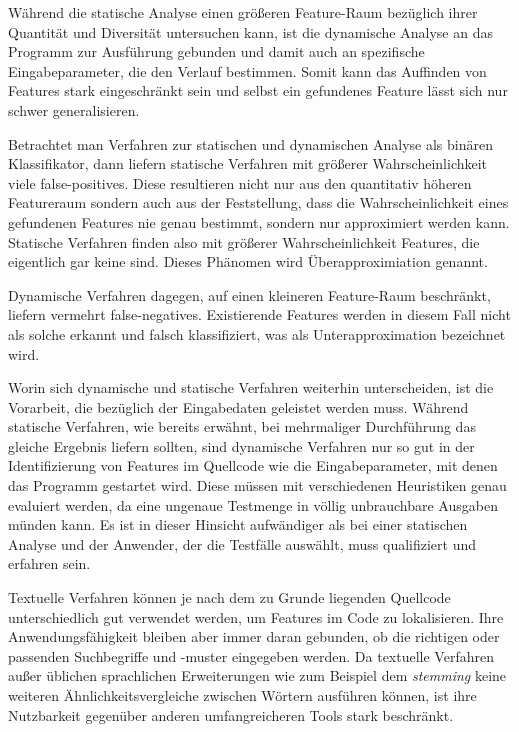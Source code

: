 \documentclass[runningheads,a4paper]{llncs}
\begin{document}
Während die statische Analyse einen größeren Feature-Raum bezüglich ihrer Quantität und Diversität untersuchen kann, ist die dynamische Analyse an das Programm zur Ausführung gebunden und damit auch an spezifische Eingabeparameter, die den Verlauf bestimmen. Somit kann das Auffinden von Features stark eingeschränkt sein und selbst ein gefundenes Feature lässt sich nur schwer generalisieren.

Betrachtet man Verfahren zur statischen und dynamischen Analyse als binären Klassifikator, dann liefern statische Verfahren mit größerer Wahrscheinlichkeit viele false-positives. Diese resultieren nicht nur aus den quantitativ höheren Featureraum sondern auch aus der Feststellung, dass die Wahrscheinlichkeit eines gefundenen Features nie genau bestimmt, sondern nur approximiert werden kann. Statische Verfahren finden also mit größerer Wahrscheinlichkeit Features, die eigentlich gar keine sind. Dieses Phänomen wird Überapproximiation genannt.

Dynamische Verfahren dagegen, auf einen kleineren Feature-Raum beschränkt, liefern vermehrt false-negatives. Existierende Features werden in diesem Fall nicht als solche erkannt und falsch klassifiziert, was als Unterapproximation bezeichnet wird.

Worin sich dynamische und statische Verfahren weiterhin unterscheiden, ist die Vorarbeit, die bezüglich der Eingabedaten geleistet werden muss. Während statische Verfahren, wie bereits erwähnt, bei mehrmaliger Durchführung das gleiche Ergebnis liefern sollten, sind dynamische Verfahren nur so gut in der Identifizierung von Features im Quellcode wie die Eingabeparameter, mit denen das Programm gestartet wird. Diese müssen mit verschiedenen Heuristiken genau evaluiert werden, da eine ungenaue Testmenge in völlig unbrauchbare Ausgaben münden kann. Es ist in dieser Hinsicht aufwändiger als bei einer statischen Analyse und der Anwender, der die Testfälle auswählt, muss qualifiziert und erfahren sein.

Textuelle Verfahren können je nach dem zu Grunde liegenden Quellcode unterschiedlich gut verwendet werden, um Features im Code zu lokalisieren. Ihre Anwendungsfähigkeit bleiben aber immer daran gebunden, ob die richtigen oder passenden Suchbegriffe und -muster eingegeben werden. Da textuelle Verfahren außer üblichen sprachlichen Erweiterungen wie zum Beispiel dem \textit{stemming} keine weiteren Ähnlichkeitsvergleiche zwischen Wörtern ausführen können, ist ihre Nutzbarkeit gegenüber anderen umfangreicheren Tools stark beschränkt.
\end{document}
